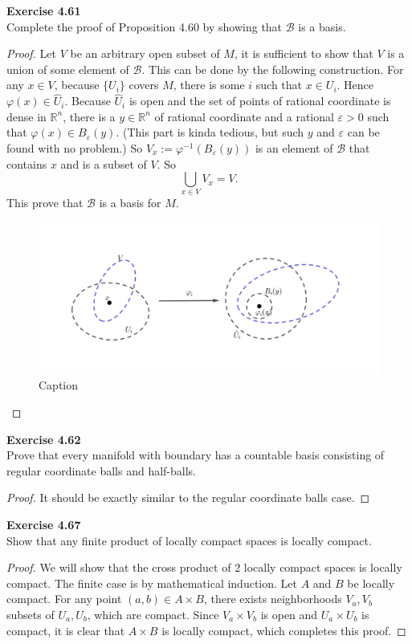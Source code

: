 \documentclass[12pt, a4paper]{article}
\theoremstyle{plain}
\newcommand{\B}{\mathscr{B}}
\newcommand{\R}{\mathbb{R}}
\def\phi{\varphi}
\def\epsilon{\varepsilon}
\newenvironment{exercise}[2][Exercise]
    { \begin{mdframed}[backgroundcolor=gray!20] \textbf{#1 #2} \\}
    {  \end{mdframed}}
\begin{document}
\begin{exercise}{4.61}
Complete the proof of Proposition 4.60 by showing that $\B$ is a basis.
\end{exercise}
    \begin{proof}
        Let $V$ be an arbitrary open subset of $M$, it is sufficient to show that $V$ is a union of some element of $\B$. This can be done by the following construction. For any $x\in V$, because $\{U_i\}$ covers $M$, there is some $i$ such that $x\in U_i$. Hence $\phi(x)\in \hat U_i$. Because $\hat U_i$ is open and the set of points of rational coordinate is dense in $\R^n$, there is a $y\in \R^n$ of rational coordinate and a rational $\epsilon>0$ such that $\varphi(x)\in B_\epsilon(y)$. (This part is kinda tedious, but such $y$ and $\epsilon$ can be found with no problem.) So $V_x:=\phi^{-1}(B_\epsilon(y))$ is an element of $\B$ that contains $x$ and is a subset of $V$. So 
        \[
        \bigcup_{x\in V}V_x = V.
        \]
        This prove that $\B$ is a basis for $M$.
        \begin{figure}[H]
            \centering
            \includegraphics[scale = 0.3]{Topology-Lee/image5.jpg}
            \caption{Caption}
            \label{fig:enter-label}
        \end{figure}
    \end{proof}

\begin{exercise}{4.62}
Prove that every manifold with boundary has a countable basis consisting of regular coordinate balls and half-balls.
\end{exercise}
    \begin{proof}
        It should be exactly similar to the regular coordinate balls case.
    \end{proof}

\begin{exercise}{4.67}
    Show that any finite product of locally compact spaces is locally compact.
\end{exercise}
    \begin{proof}
        We will show that the cross product of $2$ locally compact spaces is locally compact. The finite case is by mathematical induction. Let $A$ and $B$ be locally compact. For any point $(a,b)\in A\times B$, there exists neighborhoods $V_a,V_b$ subsets of $U_a, U_b$, which are compact. Since $V_a\times V_b$ is open and $U_a\times U_b$ is compact, it is clear that $A\times B$ is locally compact, which completes this proof.
    \end{proof}
\end{document}
